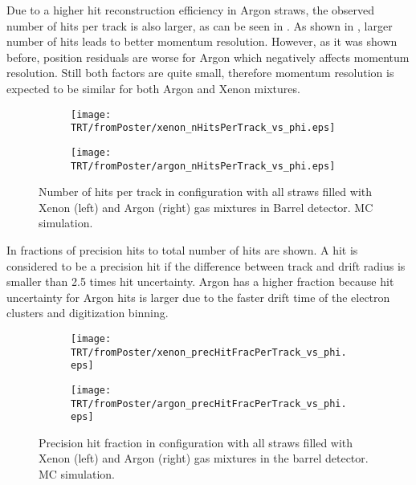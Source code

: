 
Due to a higher hit reconstruction efficiency in Argon straws, the observed number of hits per track is also larger, as can be seen in . 
As shown in , larger number of hits leads to better momentum resolution. However, as it was shown before, position residuals are
worse for Argon which negatively affects momentum resolution. Still both factors are quite small, therefore momentum resolution is expected to be similar for
both Argon and Xenon mixtures.

\begin{figure}

\begin{subfigure}{.5\textwidth}
  \centering
  \texttt{[image: TRT/fromPoster/xenon\_nHitsPerTrack\_vs\_phi.eps]}
\end{subfigure}%
\begin{subfigure}{.5\textwidth}
  \centering
  \texttt{[image: TRT/fromPoster/argon\_nHitsPerTrack\_vs\_phi.eps]}
\end{subfigure}

\caption{Number of hits per track in configuration with all straws filled with Xenon (left) and Argon (right) gas mixtures in Barrel detector. MC simulation.}
  \label{fig:nHitsPerTrack}
\end{figure}

In  fractions of precision hits to total number of hits are shown. A hit is considered to be a precision
hit if the difference between track and drift radius is smaller than 2.5 times hit uncertainty. Argon has a higher fraction because hit uncertainty
for Argon hits is larger due to the faster drift time of the electron clusters and digitization binning. 

\begin{figure}

\begin{subfigure}{.5\textwidth}
  \centering
  \texttt{[image: TRT/fromPoster/xenon\_precHitFracPerTrack\_vs\_phi.eps]}
\end{subfigure}%
\begin{subfigure}{.5\textwidth}
  \centering
  \texttt{[image: TRT/fromPoster/argon\_precHitFracPerTrack\_vs\_phi.eps]}
\end{subfigure}

\caption{Precision hit fraction in configuration with all straws filled with Xenon (left) and Argon (right) gas mixtures in the barrel detector. MC simulation.}
  \label{fig:precHitFracPerTrack}
\end{figure}

